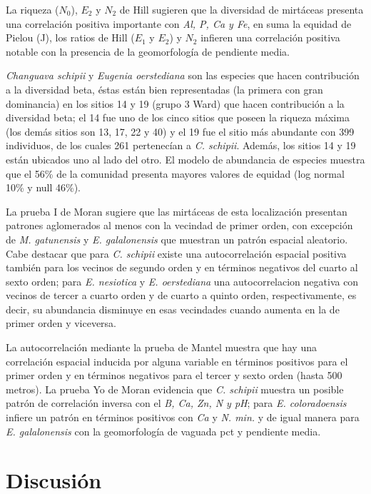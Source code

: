 \documentclass[11pt,]{article}
\begin{document}
La riqueza (\(N_0\)), \(E_2\) y \(N_2\) de Hill sugieren que la
diversidad de mirtáceas presenta una correlación positiva importante con
\emph{Al, P, Ca y Fe}, en suma la equidad de Pielou (J), los ratios de
Hill (\(E_1\) y \(E_2\)) y \(N_2\) infieren una correlación positiva
notable con la presencia de la geomorfología de pendiente media.

\emph{Changuava schipii} y \emph{Eugenia oerstediana} son las especies
que hacen contribución a la diversidad beta, éstas están bien
representadas (la primera con gran dominancia) en los sitios 14 y 19
(grupo 3 Ward) que hacen contribución a la diversidad beta; el 14 fue
uno de los cinco sitios que poseen la riqueza máxima (los demás sitios
son 13, 17, 22 y 40) y el 19 fue el sitio más abundante con 399
individuos, de los cuales 261 pertenecían a \emph{C. schipii}. Además,
los sitios 14 y 19 están ubicados uno al lado del otro. El modelo de
abundancia de especies muestra que el 56\% de la comunidad presenta
mayores valores de equidad (log normal 10\% y null 46\%).

La prueba I de Moran sugiere que las mirtáceas de esta localización
presentan patrones aglomerados al menos con la vecindad de primer orden,
con excepción de \emph{M. gatunensis} y \emph{E. galalonensis} que
muestran un patrón espacial aleatorio. Cabe destacar que para \emph{C.
schipii} existe una autocorrelación espacial positiva también para los
vecinos de segundo orden y en términos negativos del cuarto al sexto
orden; para \emph{E. nesiotica} y \emph{E. oerstediana} una
autocorrelacion negativa con vecinos de tercer a cuarto orden y de
cuarto a quinto orden, respectivamente, es decir, su abundancia
disminuye en esas vecindades cuando aumenta en la de primer orden y
viceversa.

La autocorrelación mediante la prueba de Mantel muestra que hay una
correlación espacial inducida por alguna variable en términos positivos
para el primer orden y en términos negativos para el tercer y sexto
orden (hasta 500 metros). La prueba Yo de Moran evidencia que \emph{C.
schipii} muestra un posible patrón de correlación inversa con el
\emph{B, Ca, Zn, N y pH}; para \emph{E. coloradoensis} infiere un patrón
en términos positivos con \emph{Ca} y \emph{N. min.} y de igual manera
para \emph{E. galalonensis} con la geomorfología de vaguada pct y
pendiente media.

\section{Discusión}\label{discusiuxf3n}
\end{document}
